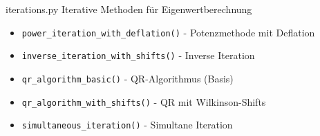 \begin{KR}{iterations.py}
    Iterative Methoden für Eigenwertberechnung
    \begin{itemize}
        \item \texttt{power\_iteration\_with\_deflation()} - Potenzmethode mit Deflation
        \item \texttt{inverse\_iteration\_with\_shifts()} - Inverse Iteration
        \item \texttt{qr\_algorithm\_basic()} - QR-Algorithmus (Basis)
        \item \texttt{qr\_algorithm\_with\_shifts()} - QR mit Wilkinson-Shifts
        \item \texttt{simultaneous\_iteration()} - Simultane Iteration
    \end{itemize}
\end{KR}